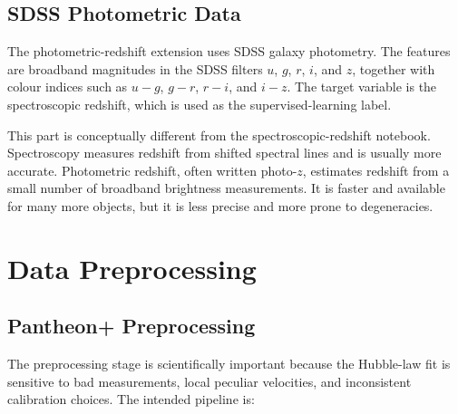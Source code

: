 \documentclass[11pt,a4paper]{article}
\begin{document}
\subsection{SDSS Photometric Data}

The photometric-redshift extension uses SDSS galaxy photometry. The features are broadband magnitudes in the SDSS filters $u$, $g$, $r$, $i$, and $z$, together with colour indices such as $u-g$, $g-r$, $r-i$, and $i-z$. The target variable is the spectroscopic redshift, which is used as the supervised-learning label.

This part is conceptually different from the spectroscopic-redshift notebook. Spectroscopy measures redshift from shifted spectral lines and is usually more accurate. Photometric redshift, often written photo-$z$, estimates redshift from a small number of broadband brightness measurements. It is faster and available for many more objects, but it is less precise and more prone to degeneracies.

\section{Data Preprocessing}

\subsection{Pantheon+ Preprocessing}

The preprocessing stage is scientifically important because the Hubble-law fit is sensitive to bad measurements, local peculiar velocities, and inconsistent calibration choices. The intended pipeline is:
\end{document}
